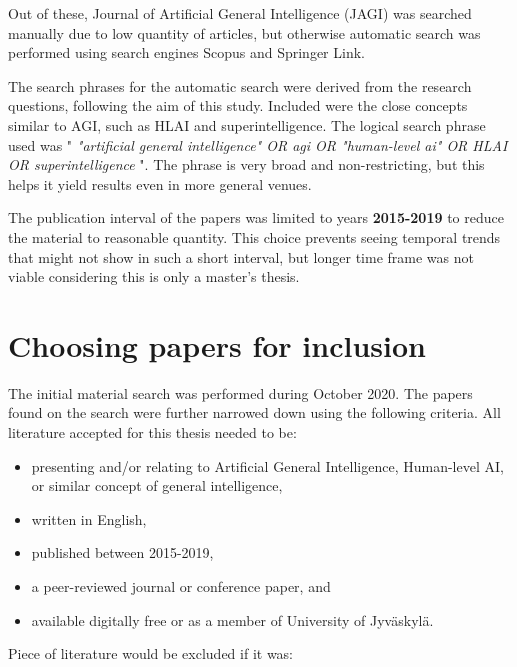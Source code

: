\documentclass[utf8,english]{gradu3}
\begin{document}

Out of these, Journal of Artificial General
Intelligence (JAGI) was searched manually due to low quantity of articles, but
otherwise automatic search was performed using search engines Scopus and
Springer Link.

The search phrases for the automatic search were derived from the research
questions, following the aim of this study. Included were the close concepts
similar to AGI, such as HLAI and superintelligence. The logical search phrase
used was " \emph{"artificial general intelligence" OR agi OR "human-level ai" OR
HLAI OR superintelligence} ". The phrase is very broad and non-restricting, but
this helps it yield results even in more general venues.

The publication interval of the papers was limited to years \textbf{2015-2019}
to reduce the material to reasonable quantity. This choice prevents seeing
temporal trends that might not show in such a short interval, but longer time
frame was not viable considering this is only a master's thesis.

\section{Choosing papers for inclusion}

The initial material search was performed during October 2020. The papers found
on the search were further narrowed down using the following criteria. All
literature accepted for this thesis needed to be:

\begin{itemize}
  \item presenting and/or relating to Artificial General Intelligence,
        Human-level AI, or similar concept of general intelligence,
  \item written in English,
  \item published between 2015-2019,
  \item a peer-reviewed journal or conference paper, and
  \item available digitally free or as a member of University of Jyväskylä.
\end{itemize}

Piece of literature would be excluded if it was:
\end{document}

